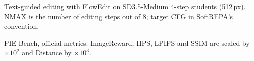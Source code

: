 \documentclass{article}
\begin{document}
\begin{table}[h]\centering
\caption{Text-guided editing with FlowEdit on SD3.5-Medium 4-step students (512\,px). NMAX is the number of editing
steps out of 8; target CFG in SoftREPA's convention.}
\resizebox{\textwidth}{!}{}
\end{table}
\begin{table}[h]\centering
\caption{PIE-Bench, official metrics. ImageReward, HPS, LPIPS and SSIM are scaled by $\times 10^2$ and Distance by
$\times 10^3$.}
\resizebox{\textwidth}{!}{}
\end{table}
\end{document}
